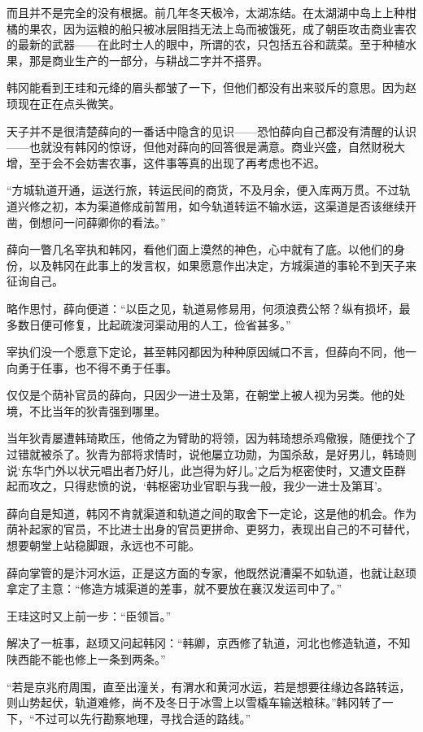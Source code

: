而且并不是完全的没有根据。前几年冬天极冷，太湖冻结。在太湖湖中岛上上种柑橘的果农，因为运粮的船只被冰层阻挡无法上岛而被饿死，成了朝臣攻击商业害农的最新的武器——在此时士人的眼中，所谓的农，只包括五谷和蔬菜。至于种植水果，那是商业生产的一部分，与耕战二字并不搭界。

韩冈能看到王珪和元绛的眉头都皱了一下，但他们都没有出来驳斥的意思。因为赵顼现在正在点头微笑。

天子并不是很清楚薛向的一番话中隐含的见识——恐怕薛向自己都没有清醒的认识——也就没有韩冈的惊讶，但他对薛向的回答很是满意。商业兴盛，自然财税大增，至于会不会妨害农事，这件事等真的出现了再考虑也不迟。

“方城轨道开通，运送行旅，转运民间的商货，不及月余，便入库两万贯。不过轨道兴修之初，本为渠道修成前暂用，如今轨道转运不输水运，这渠道是否该继续开凿，倒想问一问薛卿你的看法。”

薛向一瞥几名宰执和韩冈，看他们面上漠然的神色，心中就有了底。以他们的身份，以及韩冈在此事上的发言权，如果愿意作出决定，方城渠道的事轮不到天子来征询自己。

略作思忖，薛向便道：“以臣之见，轨道易修易用，何须浪费公帑？纵有损坏，最多数日便可修复，比起疏浚河渠动用的人工，俭省甚多。”

宰执们没一个愿意下定论，甚至韩冈都因为种种原因缄口不言，但薛向不同，他一向勇于任事，也不得不勇于任事。

仅仅是个荫补官员的薛向，只因少一进士及第，在朝堂上被人视为另类。他的处境，不比当年的狄青强到哪里。

当年狄青屡遭韩琦欺压，他倚之为臂助的将领，因为韩琦想杀鸡儆猴，随便找个了过错就被杀了。狄青为部将求情时，说他屡立功勋，为国杀敌，是好男儿，韩琦则说‘东华门外以状元唱出者乃好儿，此岂得为好儿。’之后为枢密使时，又遭文臣群起而攻之，只得悲愤的说，‘韩枢密功业官职与我一般，我少一进士及第耳’。

薛向自是知道，韩冈不肯就渠道和轨道之间的取舍下一定论，这是他的机会。作为荫补起家的官员，不比进士出身的官员更拼命、更努力，表现出自己的不可替代，想要朝堂上站稳脚跟，永远也不可能。

薛向掌管的是汴河水运，正是这方面的专家，他既然说漕渠不如轨道，也就让赵顼拿定了主意：“修造方城渠道的差事，就不要放在襄汉发运司中了。”

王珪这时又上前一步：“臣领旨。”

解决了一桩事，赵顼又问起韩冈：“韩卿，京西修了轨道，河北也修造轨道，不知陕西能不能也修上一条到两条。”

“若是京兆府周围，直至出潼关，有渭水和黄河水运，若是想要往缘边各路转运，则山势起伏，轨道难修，尚不及冬日于冰雪上以雪橇车输送粮秣。”韩冈转了一下，“不过可以先行勘察地理，寻找合适的路线。”

